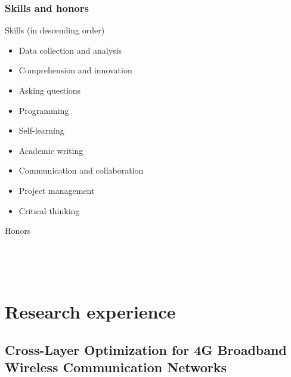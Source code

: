 \documentclass{beamer}
\begin{document}
\begin{frame}
\frametitle{Skills and honors}

\begin{block}{Skills (in descending order)}
\begin{itemize}
  \item Data collection and analysis
  \item Comprehension and innovation
  \item Asking questions
  \item Programming
  \item Self-learning
  \item Academic writing
  \item Communication and collaboration
  \item Project management
  \item Critical thinking
\end{itemize}
\end{block}

\begin{block}{Honors}
\begin{minipage}[t]{0.7\textwidth}
\end{minipage}
~
\begin{minipage}[t]{0.2\textwidth}
\end{minipage}


\begin{minipage}[t]{0.7\textwidth}
\end{minipage}
~
\begin{minipage}[t]{0.2\textwidth}
\end{minipage}

\end{block}

\end{frame}



\section{Research experience}

\subsection{Cross-Layer Optimization for 4G Broadband Wireless Communication Networks}
\end{document}

